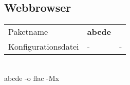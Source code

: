 \subsection{Webbrowser}
\begin{tabular}{l|l|l}
Paketname & \textbf{abcde}  \\ 
Konfigurationsdatei & - & - \\
\end{tabular}
\\
abcde -o flac -Mx
